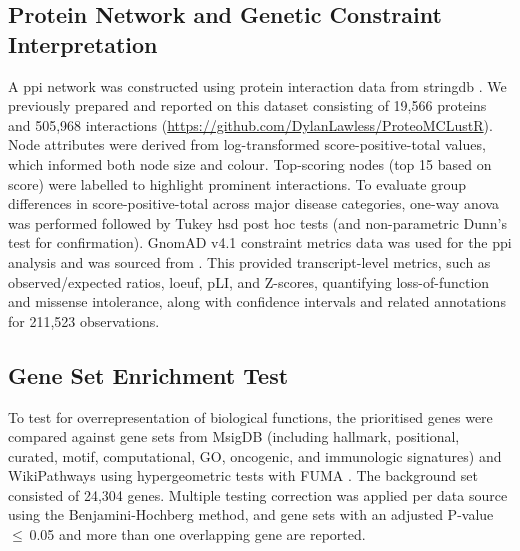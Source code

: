 \subsection{Protein Network and Genetic Constraint Interpretation}
A \ac{ppi} network was constructed using protein interaction data from \ac{stringdb} \cite{szklarczyk2025string}. We previously prepared and reported 
on this dataset consisting of 19,566 proteins and 505,968 interactions 
(\url{https://github.com/DylanLawless/ProteoMCLustR}).
Node attributes were derived from log-transformed score-positive-total values, which informed both node size and colour. Top-scoring nodes (top 15 based on score) were labelled to highlight prominent interactions. To evaluate group differences in score-positive-total across major disease categories, one-way \ac{anova} was performed followed by Tukey \ac{hsd} post hoc tests (and non-parametric Dunn’s test for confirmation). 
GnomAD v4.1 constraint metrics data was used for the \ac{ppi} analysis and was sourced from \citet{karczewski2020mutational}.
This provided transcript-level metrics, such as observed/expected ratios, \ac{loeuf}, pLI, and Z-scores, quantifying loss-of-function and missense intolerance, along with confidence intervals and related annotations for 211,523 observations.

\subsection{Gene Set Enrichment Test}

To test for overrepresentation of biological functions, the prioritised genes were compared against gene sets from MsigDB (including hallmark, positional, curated, motif, computational, GO, oncogenic, and immunologic signatures) and WikiPathways using hypergeometric tests with FUMA \cite{watanabe_functional_2017, liberzon_molecular_2011}. The background set consisted of 24,304 genes. Multiple testing correction was applied per data source using the Benjamini-Hochberg method, and gene sets with an adjusted P-value $\le$ 0.05 and more than one overlapping gene are reported.

